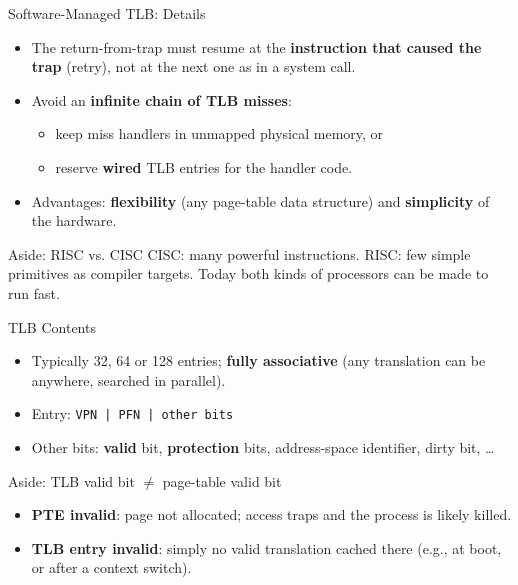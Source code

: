 \begin{frame}{Software-Managed TLB: Details}

\begin{itemize}
    \item The return-from-trap must resume at the
          \textbf{instruction that caused the trap} (retry),
          not at the next one as in a system call.
    \item Avoid an \textbf{infinite chain of TLB misses}:
    \begin{itemize}
        \item keep miss handlers in unmapped physical memory, or
        \item reserve \textbf{wired} TLB entries for the handler code.
    \end{itemize}
    \item Advantages: \textbf{flexibility} (any page-table data structure)
          and \textbf{simplicity} of the hardware.
\end{itemize}

\begin{block}{Aside: RISC vs. CISC}
CISC: many powerful instructions. RISC: few simple primitives as compiler
targets. Today both kinds of processors can be made to run fast.
\end{block}

\end{frame}

\begin{frame}{TLB Contents}

\begin{itemize}
    \item Typically 32, 64 or 128 entries; \textbf{fully associative}
          (any translation can be anywhere, searched in parallel).
    \item Entry: \quad \texttt{VPN \;|\; PFN \;|\; other bits}
    \item Other bits: \textbf{valid} bit, \textbf{protection} bits,
          address-space identifier, dirty bit, \ldots
\end{itemize}

\begin{alertblock}{Aside: TLB valid bit $\neq$ page-table valid bit}
\begin{itemize}
    \item \textbf{PTE invalid}: page not allocated; access traps and the
          process is likely killed.
    \item \textbf{TLB entry invalid}: simply no valid translation cached there
          (e.g., at boot, or after a context switch).
\end{itemize}
\end{alertblock}

\end{frame}

